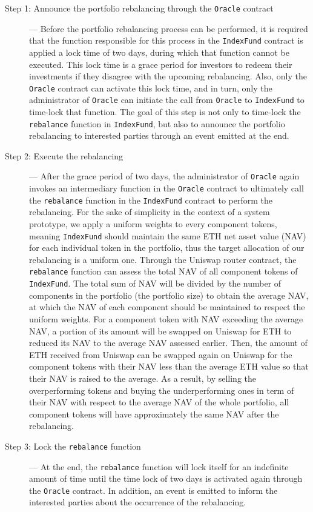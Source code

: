 \begin{description}
  \item[Step 1: Announce the portfolio rebalancing through the \texttt{Oracle} contract] ---  Before the portfolio rebalancing process can be performed, it is required that the function responsible for this process in the \texttt{IndexFund} contract is applied a lock time of two days, during which that function cannot be executed. This lock time is a grace period for investors to redeem their investments if they disagree with the upcoming rebalancing. Also, only the \texttt{Oracle} contract can activate this lock time, and in turn, only the administrator of \texttt{Oracle} can initiate the call from \texttt{Oracle} to \texttt{IndexFund} to time-lock that function. The goal of this step is not only to time-lock the \texttt{rebalance} function in \texttt{IndexFund}, but also to announce the portfolio rebalancing to interested parties through an event emitted at the end.
  
  
  \item[Step 2: Execute the rebalancing] --- After the grace period of two days, the administrator of \texttt{Oracle} again invokes an intermediary function in the \texttt{Oracle} contract to ultimately call the \texttt{rebalance} function in the \texttt{IndexFund} contract to perform the rebalancing. For the sake of simplicity in the context of a system prototype, we apply a uniform weights to every component tokens, meaning \texttt{IndexFund} should maintain the same ETH net asset value (NAV) for each individual token in the portfolio, thus the target allocation of our rebalancing is a uniform one. Through the Uniswap router contract, the \texttt{rebalance} function can assess the total NAV of all component tokens of \texttt{IndexFund}. The total sum of NAV will be divided by the number of components in the portfolio (the portfolio size) to obtain the average NAV, at which the NAV of each component should be maintained to respect the uniform weights. For a component token with NAV exceeding the average NAV, a portion of its amount will be swapped on Uniswap for ETH to reduced its NAV to the average NAV assessed earlier. Then, the amount of ETH received from Uniswap can be swapped again on Uniswap for the component tokens with their NAV less than the average ETH value so that their NAV is raised to the average. As a result, by selling the overperforming tokens and buying the underperforming ones in term of their NAV with respect to the average NAV of the whole portfolio, all component tokens will have approximately the same NAV after the rebalancing. 
  
  \item[Step 3: Lock the \texttt{rebalance} function] --- At the end, the \texttt{rebalance} function will lock itself for an indefinite amount of time until the time lock of two days is activated again through the \texttt{Oracle} contract. In addition, an event is emitted to inform the interested parties about the occurrence of the rebalancing.
\end{description}




